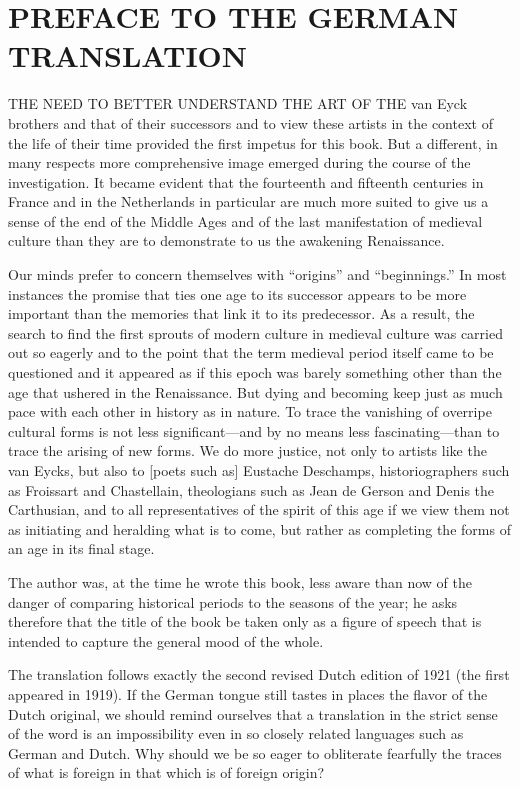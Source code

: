 \chapter{PREFACE TO THE GERMAN TRANSLATION}

THE NEED TO BETTER UNDERSTAND THE ART OF THE van Eyck brothers and that
of their successors and to view these artists in the context of the life
of their time provided the first impetus for this book. But a different,
in many respects more comprehensive image emerged during the course of
the investigation. It became evident that the fourteenth and fifteenth
centuries in France and in the Netherlands in particular are much more
suited to give us a sense of the end of the Middle Ages and of the last
manifestation of medieval culture than they are to demonstrate to us the
awakening Renaissance.

Our minds prefer to concern themselves with ``origins'' and
``beginnings.'' In most instances the promise that ties one age to its
successor appears to be more important than the memories that link it to
its predecessor. As a result, the search to find the first sprouts of
modern culture in medieval culture was carried out so eagerly and to the
point that the term medieval period itself came to be questioned and it
appeared as if this epoch was barely something other than the age that
ushered in the Renaissance. But dying and becoming keep just as much
pace with each other in history as in nature. To trace the vanishing of
overripe cultural forms is not less significant---and by no means less
fascinating---than to trace the arising of new forms. We do more
justice, not only to artists like the van Eycks, but also to {[}poets
such as{]} Eustache Deschamps, historiographers such as Froissart and
Chastellain, theologians such as Jean de Gerson and Denis the
Carthusian, and to all representatives of the spirit of this age if we
view them not as initiating and heralding what is to come, but rather as
completing the forms of an age in its final stage.

The author was, at the time he wrote this book, less aware than now of
the danger of comparing historical periods to the seasons of the year;
he asks therefore that the title of the book be taken
\protect\hypertarget{07_PREFACE_TO_THE_GERMAN_TRANSLATIO.xhtmlux5cux23page_xxii}{}{}only
as a figure of speech that is intended to capture the general mood of
the whole.

The translation follows exactly the second revised Dutch edition of 1921
(the first appeared in 1919). If the German tongue still tastes in
places the flavor of the Dutch original, we should remind ourselves that
a translation in the strict sense of the word is an impossibility even
in so closely related languages such as German and Dutch. Why should we
be so eager to obliterate fearfully the traces of what is foreign in
that which is of foreign origin?

